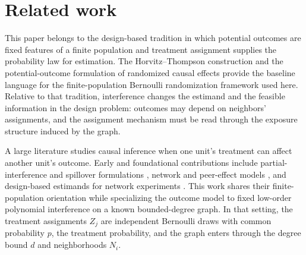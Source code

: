 \section{Related work}

This paper belongs to the design-based tradition in which potential outcomes are fixed features of a finite population and treatment assignment supplies the probability law for estimation. The Horvitz--Thompson construction \citep{HorvitzThompson1952} and the potential-outcome formulation of randomized causal effects \citep{Rubin1978,ImbensRubin2015} provide the baseline language for the finite-population Bernoulli randomization framework used here. Relative to that tradition, interference changes the estimand and the feasible information in the design problem: outcomes may depend on neighbors' assignments, and the assignment mechanism must be read through the exposure structure induced by the graph.

A large literature studies causal inference when one unit's treatment can affect another unit's outcome. Early and foundational contributions include partial-interference and spillover formulations \citep{Manski1993,Sobel2006,HudgensHalloran2008}, network and peer-effect models \citep{Graham2008,Bramoulle2009,TchetgenTchetgenVanderWeele2012,Manski2013}, and design-based estimands for network experiments \citep{Bowers2013,Ugander2013,vanDerLaan2014,Liu2016,Aronow2017,Eckles2017,Ogburn2017}. This work shares their finite-population orientation while specializing the outcome model to fixed low-order polynomial interference on a known bounded-degree graph. In that setting, the treatment assignments \(Z_j\) are independent Bernoulli draws with common probability \(p\), the treatment probability, and the graph enters through the degree bound \(d\) and neighborhoods \(N_i\).


